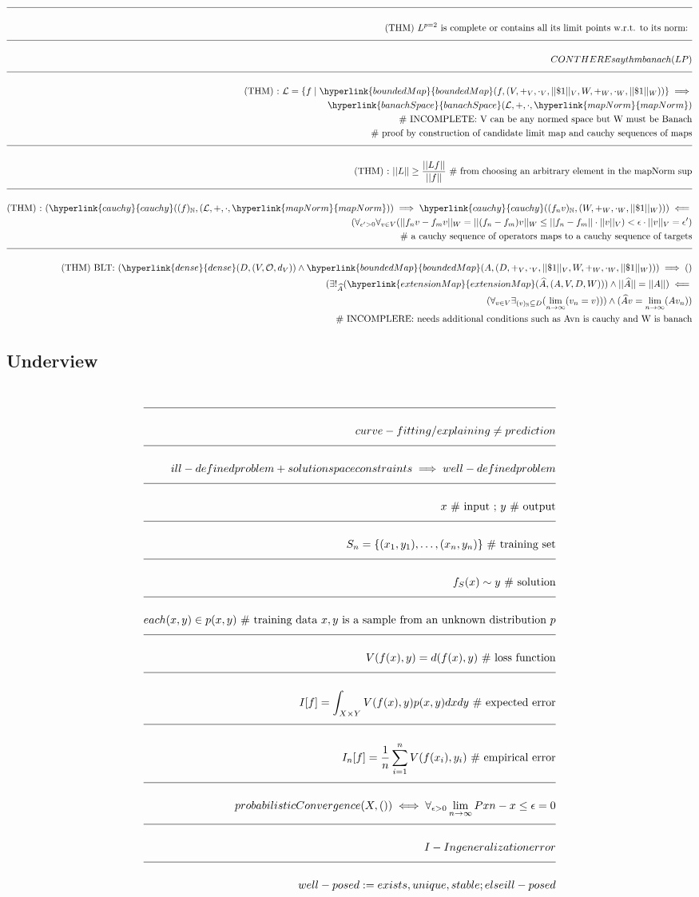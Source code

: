 \documentclass[a4paper]{article}
\newcommand{\eqComment}[1]{\text{  \# #1}}
\newcommand{\eqSep}{\text{ ;  }}
\newcommand{\thm}[1]{\text{(THM) #1: }}
\newcommand{\n}{\\[1.5ex] \hline \nonumber \\[0ex]}
\newcommand{\m}{\nonumber \\}
\newcommand{\rfr}[1]{\hyperlink{#1}{#1}}
\begin{document}
\begin{tcolorbox}
\begin{align}
\n \thm{$L^{p=2}$ is complete or contains all its limit points w.r.t. to its norm}
\n CONTHERE say thm banach(LP)
\n \thm{} \mathcal{L} = \{f \mid \rfr{boundedMap}(f, (V, +_V, \cdot_V, || \$1 ||_V, W, +_W, \cdot_W, || \$1 ||_W))\} \implies 
\m \rfr{banachSpace}(\mathcal{L}, +, \cdot, \rfr{mapNorm})
\m \eqComment{INCOMPLETE: V can be any normed space but W must be Banach}
\m \eqComment{proof by construction of candidate limit map and cauchy sequences of maps}
\n \thm{} || L || \geq \frac{|| L f ||}{|| f ||} \eqComment{from choosing an arbitrary element in the mapNorm sup}
\n \thm{} (\rfr{cauchy}((f)_\mathbb{N}, (\mathcal{L}, +, \cdot, \rfr{mapNorm})) \implies \rfr{cauchy}((f_n v)_\mathbb{N}, (W, +_W, \cdot_W, || \$1 ||_W))) \impliedby
\m (\forall_{\epsilon^\prime > 0} \forall_{v \in V} (|| f_n v - f_m v ||_W = || (f_n - f_m) v ||_W \leq || f_n - f_m || \cdot || v ||_V) < \epsilon \cdot || v ||_V = \epsilon^\prime)
\m \eqComment{a cauchy sequence of operators maps to a cauchy sequence of targets}
\n \thm{BLT} (\rfr{dense}(D, (V, \mathcal{O}, d_V)) \land \rfr{boundedMap}(A, (D, +_V, \cdot_V, || \$1 ||_V, W, +_W, \cdot_W, || \$1 ||_W))) \implies ()
\m (\exists!_{\widehat{A}} (\rfr{extensionMap}(\widehat{A}, (A, V, D, W))) \land || \widehat{A} || = || A ||) \impliedby
\m (\forall_{v \in V} \exists_{(v)_\mathbb{N} \subseteq D} (\lim_{n \to \infty} (v_n = v))) \land (\widehat{A} v = \lim_{n \to \infty} (A v_n))
\m \eqComment{INCOMPLERE: needs additional conditions such as Avn is cauchy and W is banach}
\end{align}
\end{tcolorbox}


\subsection{Underview}
\begin{tcolorbox}
\begin{align}
\n curve-fitting / explaining \neq prediction
\n ill-defined problem + solution space constraints \implies well-defined problem
\n x \eqComment{input} \eqSep y \eqComment{output}
\n S_n = \{(x_1, y_1), \ldots, (x_n, y_n)\} \eqComment{training set}
\n f_S(x) \sim y \eqComment{solution}
\n each (x,y) \in p(x, y) \eqComment{training data $x, y$ is a sample from an unknown distribution $p$}
\n V(f(x), y) = d(f(x), y) \eqComment{loss function}
\n I[f] = \int_{X \times Y}{V(f(x), y) p(x, y) dx dy} \eqComment{expected error}
\n I_n[f] = \frac{1}{n} \sum_{i=1}^{n}{V(f(x_i), y_i)} \eqComment{empirical error}
\n probabilisticConvergence(X, ()) \iff \forall_{\epsilon > 0} \lim_{n \to \infty}{P{xn - x} \leq \epsilon} = 0
\n I - In generalization error
\n well-posed := exists, unique, stable ; else ill-posed
\end{align}
\end{tcolorbox}
\end{document}
